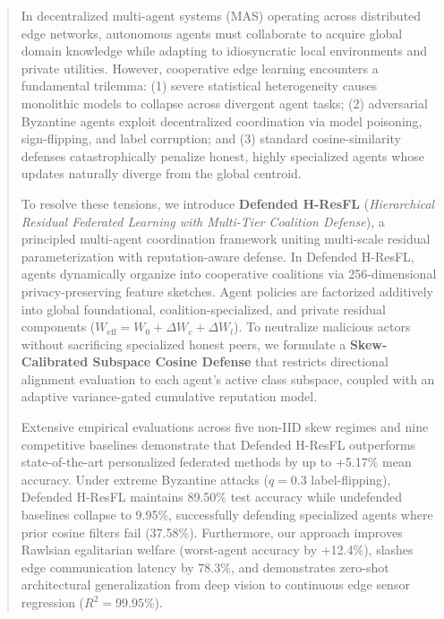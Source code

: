 \documentclass[sigconf]{acmart}
\begin{document}
\begin{abstract}
In decentralized multi-agent systems (MAS) operating across distributed edge networks, autonomous agents must collaborate to acquire global domain knowledge while adapting to idiosyncratic local environments and private utilities. However, cooperative edge learning encounters a fundamental trilemma: (1) severe statistical heterogeneity causes monolithic models to collapse across divergent agent tasks; (2) adversarial Byzantine agents exploit decentralized coordination via model poisoning, sign-flipping, and label corruption; and (3) standard cosine-similarity defenses catastrophically penalize honest, highly specialized agents whose updates naturally diverge from the global centroid.

To resolve these tensions, we introduce \textbf{Defended H-ResFL} (\textit{Hierarchical Residual Federated Learning with Multi-Tier Coalition Defense}), a principled multi-agent coordination framework uniting multi-scale residual parameterization with reputation-aware defense. In Defended H-ResFL, agents dynamically organize into cooperative coalitions via 256-dimensional privacy-preserving feature sketches. Agent policies are factorized additively into global foundational, coalition-specialized, and private residual components ($W_{\text{eff}} = W_0 + \Delta W_c + \Delta W_l$). To neutralize malicious actors without sacrificing specialized honest peers, we formulate a \textbf{Skew-Calibrated Subspace Cosine Defense} that restricts directional alignment evaluation to each agent's active class subspace, coupled with an adaptive variance-gated cumulative reputation model.

Extensive empirical evaluations across five non-IID skew regimes and nine competitive baselines demonstrate that Defended H-ResFL outperforms state-of-the-art personalized federated methods by up to +5.17\% mean accuracy. Under extreme Byzantine attacks ($q = 0.3$ label-flipping), Defended H-ResFL maintains 89.50\% test accuracy while undefended baselines collapse to 9.95\%, successfully defending specialized agents where prior cosine filters fail (37.58\%). Furthermore, our approach improves Rawlsian egalitarian welfare (worst-agent accuracy by +12.4\%), slashes edge communication latency by 78.3\%, and demonstrates zero-shot architectural generalization from deep vision to continuous edge sensor regression ($R^2 = 99.95\%$).
\end{abstract}

\end{document}
